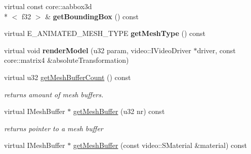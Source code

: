 \begin{DoxyCompactItemize}
\item 
\hypertarget{classirr_1_1scene_1_1_c_animated_mesh_half_life_a2e83dfc7fb3f0be1043285bb99be7964}{virtual const core\-::aabbox3d\\*
$<$ f32 $>$ \& {\bfseries get\-Bounding\-Box} () const }\label{classirr_1_1scene_1_1_c_animated_mesh_half_life_a2e83dfc7fb3f0be1043285bb99be7964}

\item 
\hypertarget{classirr_1_1scene_1_1_c_animated_mesh_half_life_a61d020cb1ac4d1a3e57c841c1138beb2}{virtual E\-\_\-\-A\-N\-I\-M\-A\-T\-E\-D\-\_\-\-M\-E\-S\-H\-\_\-\-T\-Y\-P\-E {\bfseries get\-Mesh\-Type} () const }\label{classirr_1_1scene_1_1_c_animated_mesh_half_life_a61d020cb1ac4d1a3e57c841c1138beb2}

\item 
\hypertarget{classirr_1_1scene_1_1_c_animated_mesh_half_life_a66725cd25d306ff5c69862e81501365d}{virtual void {\bfseries render\-Model} (u32 param, video\-::\-I\-Video\-Driver $\ast$driver, const core\-::matrix4 \&absolute\-Transformation)}\label{classirr_1_1scene_1_1_c_animated_mesh_half_life_a66725cd25d306ff5c69862e81501365d}

\item 
\hypertarget{classirr_1_1scene_1_1_c_animated_mesh_half_life_a16c7098f39ec5a54a830d2b60575b715}{virtual u32 \hyperlink{classirr_1_1scene_1_1_c_animated_mesh_half_life_a16c7098f39ec5a54a830d2b60575b715}{get\-Mesh\-Buffer\-Count} () const }\label{classirr_1_1scene_1_1_c_animated_mesh_half_life_a16c7098f39ec5a54a830d2b60575b715}

\begin{DoxyCompactList}\small\item\em returns amount of mesh buffers. \end{DoxyCompactList}\item 
\hypertarget{classirr_1_1scene_1_1_c_animated_mesh_half_life_a4813a431158c41b3b5f5ba8d33e2bb06}{virtual I\-Mesh\-Buffer $\ast$ \hyperlink{classirr_1_1scene_1_1_c_animated_mesh_half_life_a4813a431158c41b3b5f5ba8d33e2bb06}{get\-Mesh\-Buffer} (u32 nr) const }\label{classirr_1_1scene_1_1_c_animated_mesh_half_life_a4813a431158c41b3b5f5ba8d33e2bb06}

\begin{DoxyCompactList}\small\item\em returns pointer to a mesh buffer \end{DoxyCompactList}\item 
\hypertarget{classirr_1_1scene_1_1_c_animated_mesh_half_life_a64cfe70f0018b17d0ca0aa4e89ecf356}{virtual I\-Mesh\-Buffer $\ast$ \hyperlink{classirr_1_1scene_1_1_c_animated_mesh_half_life_a64cfe70f0018b17d0ca0aa4e89ecf356}{get\-Mesh\-Buffer} (const video\-::\-S\-Material \&material) const }\label{classirr_1_1scene_1_1_c_animated_mesh_half_life_a64cfe70f0018b17d0ca0aa4e89ecf356}


\end{DoxyCompactItemize}

